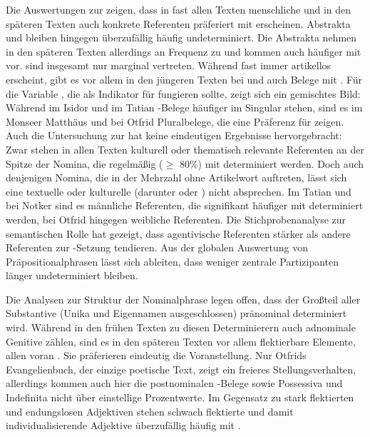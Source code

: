 Die Auswertungen zur  zeigen, dass in fast allen Texten menschliche und in den späteren Texten auch konkrete Referenten präferiert mit  erscheinen. Abstrakta  und  bleiben hingegen überzufällig häufig undeterminiert. Die Abstrakta  nehmen in den späteren Texten allerdings an Frequenz zu und kommen auch häufiger mit  vor.  sind insgesamt nur marginal vertreten. Während   fast immer artikellos erscheint, gibt es vor allem in den jüngeren Texten bei  und  auch Belege mit . Für die Variable , die als Indikator für  fungieren sollte, zeigt sich ein gemischtes Bild:  Während im Isidor und im Tatian -Belege häufiger im Singular stehen, sind es im Monseer Matthäus und bei Otfrid Pluralbelege, die eine Präferenz für  zeigen. Auch die Untersuchung zur  hat keine eindeutigen Ergebnisse hervorgebracht: Zwar stehen in allen Texten kulturell oder thematisch relevante  Referenten an der Spitze der Nomina, die regelmäßig ($\geq$ 80\%) mit  determiniert werden. Doch auch denjenigen Nomina, die in der Mehrzahl ohne Artikelwort auftreten, lässt sich eine textuelle oder kulturelle  (darunter  oder ) nicht absprechen. Im Tatian und bei Notker sind es männliche Referenten, die signifikant häufiger mit  determiniert werden, bei Otfrid hingegen weibliche Referenten. Die Stichprobenanalyse zur semantischen Rolle  hat gezeigt, dass agentivische Referenten stärker als andere Referenten zur -Setzung tendieren. Aus der globalen Auswertung von Präpositionalphrasen  lässt sich ableiten, dass weniger zentrale Partizipanten länger undeterminiert bleiben. 

Die Analysen zur Struktur der Nominalphrase   legen offen, dass der Großteil aller Substantive  (Unika  und Eigennamen  ausgeschlossen) pränominal determiniert wird. Während in den frühen Texten zu diesen Determinierern  auch adnominale Genitive  zählen, sind es in den späteren Texten vor allem flektierbare  Elemente, allen voran . Sie präferieren eindeutig die Voranstellung. Nur Otfrids Evangelienbuch, der einzige poetische Text, zeigt ein freieres Stellungsverhalten, allerdings kommen auch hier die postnominalen -Belege sowie Possessiva  und Indefinita  nicht über einstellige Prozentwerte. Im Gegensatz zu stark flektierten  und endungslosen Adjektiven  stehen schwach flektierte  und damit individualisierende Adjektive überzufällig häufig mit .
